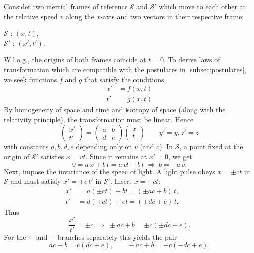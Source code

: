 \documentclass[12pt,
               open=any,
               twoside,
               a4paper,
               titlepage,
               bibliography=totoc,
               xcolor=dvipsnames,
               ]{scrartcl}
\theoremstyle{definition}
\theoremstyle{definition}
\begin{document}
			Consider two inertial frames of reference $\mathcal{S}$ and $\mathcal{S}'$ which move to each other at the relative speed $v$ along the $x$-axis and two vectors in their respective frame:
			\begin{center}
				$\mathcal{S}$ : $\left( x,t\right)$,\\
				$\mathcal{S}'$ : $\left( x',t'\right)$.
			\end{center}
			W.l.o.g., the origins of both frames coincide at $t = 0$. To derive laws of transformation which are compatible with the postulates in \autoref{subsec:postulates}, we seek functions $f$ and $g$ that satisfy the conditions
			\begin{align}
				x' & = f(x,t)\\
				t' & = g(x,t)
			\end{align}
			By homogeneity of space and time and isotropy of space (along with the relativity principle), the transformation must be linear. Hence
			\begin{equation}
				\begin{pmatrix} x'\\ t' \end{pmatrix} = \begin{pmatrix} a & b\\ d & e\end{pmatrix} \begin{pmatrix} x\\ t\end{pmatrix} \qquad y' = y, z' = z
			\end{equation}
			with constants $a,b,d,e$ depending only on $v$ (and $c$). In $\mathcal{S}$, a point fixed at the origin of
			$\mathcal{S}'$ satisfies $x = vt$. Since it remains at $x' = 0$, we get
			\begin{equation}
				0=a\,x + b\,t = a\,vt + b\,t \;\Rightarrow\; b=-a\,v.
				\label{eq:bresult}
			\end{equation}
			Next, impose the invariance of the speed of light. A light pulse obeys $x=\pm c t$ in $\mathcal S$
			and must satisfy $x'=\pm c\,t'$ in $\mathcal S'$. Insert $x=\pm c t$:
			\begin{align}
				x' & = a(\pm c t) + b t = (\pm a c + b)\, t,\qquad \nonumber\\
				t' & = d(\pm c t) + e t = (\pm d c + e)\, t. \nonumber
			\end{align}
			Thus
			$$\frac{x'}{t'}=\pm c \;\Rightarrow\; \pm a c + b = \pm c(\pm d c + e).$$
			For the $+$ and $-$ branches separately this yields the pair
			$$ ac+b = c(dc+e), \qquad -ac+b = -c(-dc+e).$$
\end{document}
